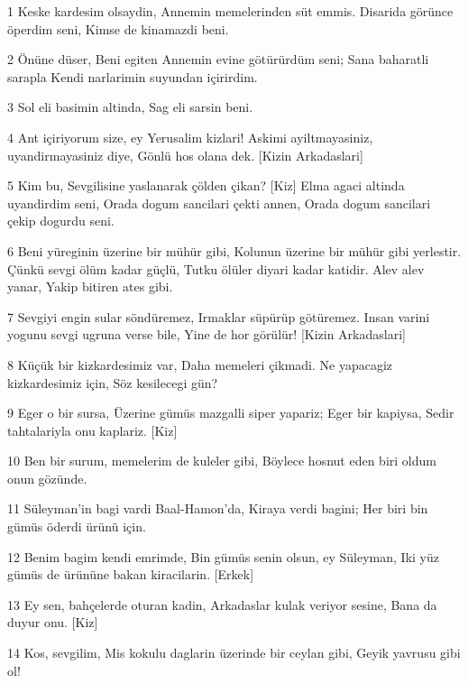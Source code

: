 \par 1 Keske kardesim olsaydin, Annemin memelerinden süt emmis. Disarida görünce öperdim seni, Kimse de kinamazdi beni.
\par 2 Önüne düser, Beni egiten Annemin evine götürürdüm seni; Sana baharatli sarapla Kendi narlarimin suyundan içirirdim.
\par 3 Sol eli basimin altinda, Sag eli sarsin beni.
\par 4 Ant içiriyorum size, ey Yerusalim kizlari! Askimi ayiltmayasiniz, uyandirmayasiniz diye, Gönlü hos olana dek. [Kizin Arkadaslari]
\par 5 Kim bu, Sevgilisine yaslanarak çölden çikan? [Kiz] Elma agaci altinda uyandirdim seni, Orada dogum sancilari çekti annen, Orada dogum sancilari çekip dogurdu seni.
\par 6 Beni yüreginin üzerine bir mühür gibi, Kolunun üzerine bir mühür gibi yerlestir. Çünkü sevgi ölüm kadar güçlü, Tutku ölüler diyari kadar katidir. Alev alev yanar, Yakip bitiren ates gibi.
\par 7 Sevgiyi engin sular söndüremez, Irmaklar süpürüp götüremez. Insan varini yogunu sevgi ugruna verse bile, Yine de hor görülür! [Kizin Arkadaslari]
\par 8 Küçük bir kizkardesimiz var, Daha memeleri çikmadi. Ne yapacagiz kizkardesimiz için, Söz kesilecegi gün?
\par 9 Eger o bir sursa, Üzerine gümüs mazgalli siper yapariz; Eger bir kapiysa, Sedir tahtalariyla onu kaplariz. [Kiz]
\par 10 Ben bir surum, memelerim de kuleler gibi, Böylece hosnut eden biri oldum onun gözünde.
\par 11 Süleyman'in bagi vardi Baal-Hamon'da, Kiraya verdi bagini; Her biri bin gümüs öderdi ürünü için.
\par 12 Benim bagim kendi emrimde, Bin gümüs senin olsun, ey Süleyman, Iki yüz gümüs de ürününe bakan kiracilarin. [Erkek]
\par 13 Ey sen, bahçelerde oturan kadin, Arkadaslar kulak veriyor sesine, Bana da duyur onu. [Kiz]
\par 14 Kos, sevgilim, Mis kokulu daglarin üzerinde bir ceylan gibi, Geyik yavrusu gibi ol!


